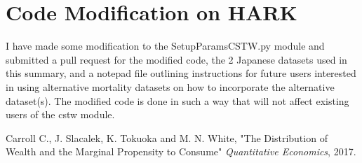 \documentclass[11pt]{article}
\begin{document}
\section{Code Modification on HARK}

I have made some modification to the SetupParamsCSTW.py module and submitted a pull request for the modified code, the 2 Japanese datasets used in this summary, and a notepad file outlining instructions for future users interested in using alternative mortality datasets on how to incorporate the alternative dataset(s). The modified code is done in such a way that will not affect existing users of the cstw module.

\begin{thebibliography}{9}
Carroll C., J. Slacalek, K. Tokuoka and M. N. White, "The Distribution of Wealth and the Marginal Propensity to Consume"
\textit{Quantitative Economics}, 2017.
\end{thebibliography}
\end{document}
